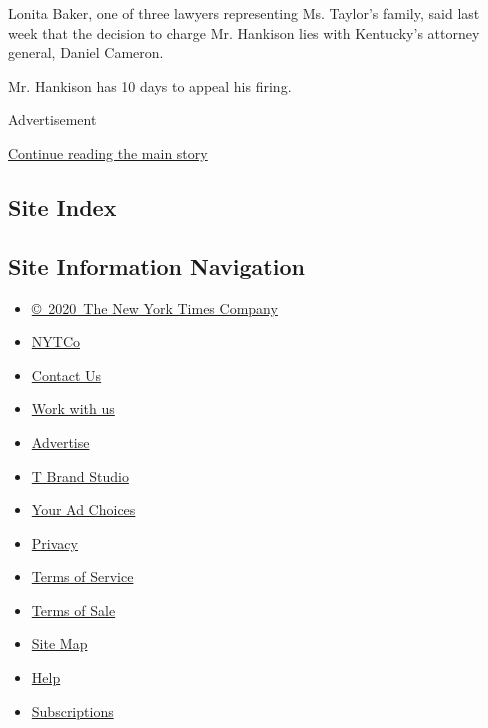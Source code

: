 Lonita Baker, one of three lawyers representing Ms. Taylor's family,
said last week that the decision to charge Mr. Hankison lies with
Kentucky's attorney general, Daniel Cameron.

Mr. Hankison has 10 days to appeal his firing.

Advertisement

\protect\hyperlink{after-bottom}{Continue reading the main story}

\hypertarget{site-index}{%
\subsection{Site Index}\label{site-index}}

\hypertarget{site-information-navigation}{%
\subsection{Site Information
Navigation}\label{site-information-navigation}}

\begin{itemize}
\tightlist
\item
  \href{https://help.nytimes3xbfgragh.onion/hc/en-us/articles/115014792127-Copyright-notice}{©~2020~The
  New York Times Company}
\end{itemize}

\begin{itemize}
\tightlist
\item
  \href{https://www.nytco.com/}{NYTCo}
\item
  \href{https://help.nytimes3xbfgragh.onion/hc/en-us/articles/115015385887-Contact-Us}{Contact
  Us}
\item
  \href{https://www.nytco.com/careers/}{Work with us}
\item
  \href{https://nytmediakit.com/}{Advertise}
\item
  \href{http://www.tbrandstudio.com/}{T Brand Studio}
\item
  \href{https://www.nytimes3xbfgragh.onion/privacy/cookie-policy\#how-do-i-manage-trackers}{Your
  Ad Choices}
\item
  \href{https://www.nytimes3xbfgragh.onion/privacy}{Privacy}
\item
  \href{https://help.nytimes3xbfgragh.onion/hc/en-us/articles/115014893428-Terms-of-service}{Terms
  of Service}
\item
  \href{https://help.nytimes3xbfgragh.onion/hc/en-us/articles/115014893968-Terms-of-sale}{Terms
  of Sale}
\item
  \href{https://spiderbites.nytimes3xbfgragh.onion}{Site Map}
\item
  \href{https://help.nytimes3xbfgragh.onion/hc/en-us}{Help}
\item
  \href{https://www.nytimes3xbfgragh.onion/subscription?campaignId=37WXW}{Subscriptions}
\end{itemize}

